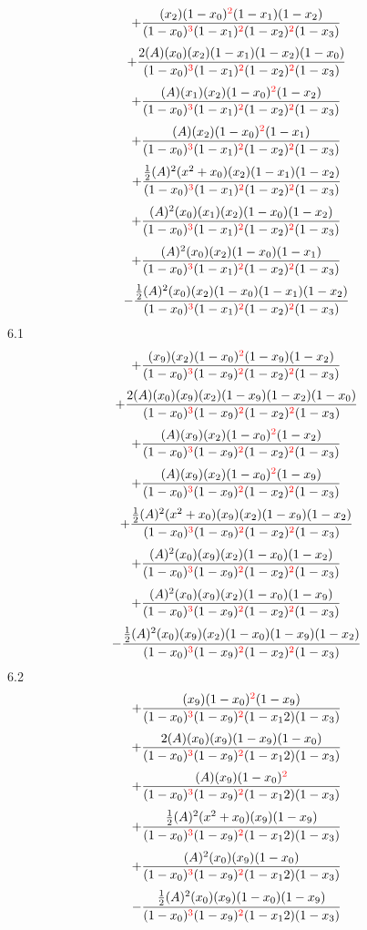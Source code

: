 \documentclass{article}
\begin{document}
\[+\frac{(x_2)(1-x_0)^{\textcolor{red}{2}}(1-x_1)(1-x_2)}{(1-x_0)^{\textcolor{red}{3}}(1-x_1)^{\textcolor{red}{2}}(1-x_2)^{\textcolor{red}{2}}(1-x_3)}\]\[+\frac{2(A)(x_0)(x_2)(1-x_1)(1-x_2)(1-x_0)}{(1-x_0)^{\textcolor{red}{3}}(1-x_1)^{\textcolor{red}{2}}(1-x_2)^{\textcolor{red}{2}}(1-x_3)}\]\[+\frac{(A)(x_1)(x_2)(1-x_0)^{\textcolor{red}{2}}(1-x_2)}{(1-x_0)^{\textcolor{red}{3}}(1-x_1)^{\textcolor{red}{2}}(1-x_2)^{\textcolor{red}{2}}(1-x_3)}\]\[+\frac{(A)(x_2)(1-x_0)^{\textcolor{red}{2}}(1-x_1)}{(1-x_0)^{\textcolor{red}{3}}(1-x_1)^{\textcolor{red}{2}}(1-x_2)^{\textcolor{red}{2}}(1-x_3)}\]\[+\frac{\frac{1}{2}(A)^{2}(x^{2}+x_0)(x_2)(1-x_1)(1-x_2)}{(1-x_0)^{\textcolor{red}{3}}(1-x_1)^{\textcolor{red}{2}}(1-x_2)^{\textcolor{red}{2}}(1-x_3)}\]\[+\frac{(A)^{2}(x_0)(x_1)(x_2)(1-x_0)(1-x_2)}{(1-x_0)^{\textcolor{red}{3}}(1-x_1)^{\textcolor{red}{2}}(1-x_2)^{\textcolor{red}{2}}(1-x_3)}\]\[+\frac{(A)^{2}(x_0)(x_2)(1-x_0)(1-x_1)}{(1-x_0)^{\textcolor{red}{3}}(1-x_1)^{\textcolor{red}{2}}(1-x_2)^{\textcolor{red}{2}}(1-x_3)}\]\[-\frac{\frac{1}{2}(A)^{2}(x_0)(x_2)(1-x_0)(1-x_1)(1-x_2)}{(1-x_0)^{\textcolor{red}{3}}(1-x_1)^{\textcolor{red}{2}}(1-x_2)^{\textcolor{red}{2}}(1-x_3)}\]
6.1
\[+\frac{(x_9)(x_2)(1-x_0)^{\textcolor{red}{2}}(1-x_9)(1-x_2)}{(1-x_0)^{\textcolor{red}{3}}(1-x_9)^{\textcolor{red}{2}}(1-x_2)^{\textcolor{red}{2}}(1-x_3)}\]\[+\frac{2(A)(x_0)(x_9)(x_2)(1-x_9)(1-x_2)(1-x_0)}{(1-x_0)^{\textcolor{red}{3}}(1-x_9)^{\textcolor{red}{2}}(1-x_2)^{\textcolor{red}{2}}(1-x_3)}\]\[+\frac{(A)(x_9)(x_2)(1-x_0)^{\textcolor{red}{2}}(1-x_2)}{(1-x_0)^{\textcolor{red}{3}}(1-x_9)^{\textcolor{red}{2}}(1-x_2)^{\textcolor{red}{2}}(1-x_3)}\]\[+\frac{(A)(x_9)(x_2)(1-x_0)^{\textcolor{red}{2}}(1-x_9)}{(1-x_0)^{\textcolor{red}{3}}(1-x_9)^{\textcolor{red}{2}}(1-x_2)^{\textcolor{red}{2}}(1-x_3)}\]\[+\frac{\frac{1}{2}(A)^{2}(x^{2}+x_0)(x_9)(x_2)(1-x_9)(1-x_2)}{(1-x_0)^{\textcolor{red}{3}}(1-x_9)^{\textcolor{red}{2}}(1-x_2)^{\textcolor{red}{2}}(1-x_3)}\]\[+\frac{(A)^{2}(x_0)(x_9)(x_2)(1-x_0)(1-x_2)}{(1-x_0)^{\textcolor{red}{3}}(1-x_9)^{\textcolor{red}{2}}(1-x_2)^{\textcolor{red}{2}}(1-x_3)}\]\[+\frac{(A)^{2}(x_0)(x_9)(x_2)(1-x_0)(1-x_9)}{(1-x_0)^{\textcolor{red}{3}}(1-x_9)^{\textcolor{red}{2}}(1-x_2)^{\textcolor{red}{2}}(1-x_3)}\]\[-\frac{\frac{1}{2}(A)^{2}(x_0)(x_9)(x_2)(1-x_0)(1-x_9)(1-x_2)}{(1-x_0)^{\textcolor{red}{3}}(1-x_9)^{\textcolor{red}{2}}(1-x_2)^{\textcolor{red}{2}}(1-x_3)}\]
6.2
\[+\frac{(x_9)(1-x_0)^{\textcolor{red}{2}}(1-x_9)}{(1-x_0)^{\textcolor{red}{3}}(1-x_9)^{\textcolor{red}{2}}(1-x_12)(1-x_3)}\]\[+\frac{2(A)(x_0)(x_9)(1-x_9)(1-x_0)}{(1-x_0)^{\textcolor{red}{3}}(1-x_9)^{\textcolor{red}{2}}(1-x_12)(1-x_3)}\]\[+\frac{(A)(x_9)(1-x_0)^{\textcolor{red}{2}}}{(1-x_0)^{\textcolor{red}{3}}(1-x_9)^{\textcolor{red}{2}}(1-x_12)(1-x_3)}\]\[+\frac{\frac{1}{2}(A)^{2}(x^{2}+x_0)(x_9)(1-x_9)}{(1-x_0)^{\textcolor{red}{3}}(1-x_9)^{\textcolor{red}{2}}(1-x_12)(1-x_3)}\]\[+\frac{(A)^{2}(x_0)(x_9)(1-x_0)}{(1-x_0)^{\textcolor{red}{3}}(1-x_9)^{\textcolor{red}{2}}(1-x_12)(1-x_3)}\]\[-\frac{\frac{1}{2}(A)^{2}(x_0)(x_9)(1-x_0)(1-x_9)}{(1-x_0)^{\textcolor{red}{3}}(1-x_9)^{\textcolor{red}{2}}(1-x_12)(1-x_3)}\]
\end{document}
